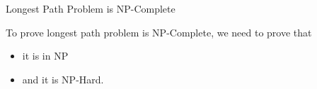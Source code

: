 \begin{frame}{Longest Path Problem is NP-Complete}

   
To prove longest path problem is NP-Complete, we need to prove that 
  \begin{itemize}
        \item<2-> it is in NP 
        \item<3-> and it is NP-Hard.
   
    
    
    \end{itemize} 

\end{frame}